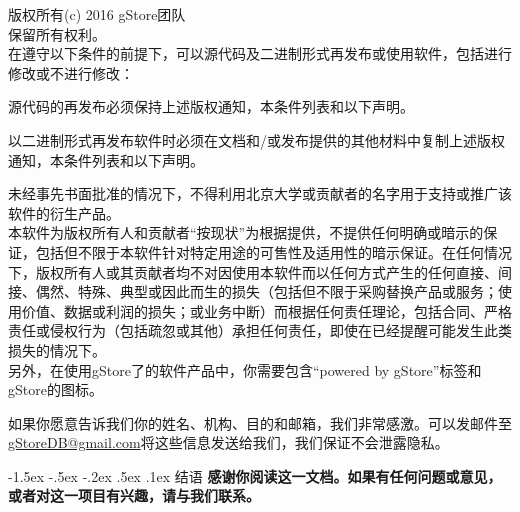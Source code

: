 \documentclass[titlepage, a4paper, 12pt]{article}
\makeatletter
\newcommand{\sihao}{\fontsize{14pt}{\baselineskip}\selectfont}
\renewcommand\section{\@startsection{section}{1}{\z@}%
{-1.5ex \@plus -.5ex \@minus -.2ex}%
{.5ex \@plus .1ex}%
{\normalfont\sihao\CJKfamily{hei}}}
\makeatother
\begin{document}
版权所有(c) 2016 gStore团队 \\
保留所有权利。\\

在遵守以下条件的前提下，可以源代码及二进制形式再发布或使用软件，包括进行修改或不进行修改：

源代码的再发布必须保持上述版权通知，本条件列表和以下声明。

以二进制形式再发布软件时必须在文档和/或发布提供的其他材料中复制上述版权通知，本条件列表和以下声明。

未经事先书面批准的情况下，不得利用北京大学或贡献者的名字用于支持或推广该软件的衍生产品。\\

本软件为版权所有人和贡献者“按现状”为根据提供，不提供任何明确或暗示的保证，包括但不限于本软件针对特定用途的可售性及适用性的暗示保证。在任何情况下，版权所有人或其贡献者均不对因使用本软件而以任何方式产生的任何直接、间接、偶然、特殊、典型或因此而生的损失（包括但不限于采购替换产品或服务；使用价值、数据或利润的损失；或业务中断）而根据任何责任理论，包括合同、严格责任或侵权行为（包括疏忽或其他）承担任何责任，即使在已经提醒可能发生此类损失的情况下。\\

另外，在使用gStore了的软件产品中，你需要包含“powered by gStore”标签和gStore的图标。

如果你愿意告诉我们你的姓名、机构、目的和邮箱，我们非常感激。可以发邮件至\href{mailto:gStoreDB@gmail.com}{gStoreDB@gmail.com}将这些信息发送给我们，我们保证不会泄露隐私。

\clearpage

\section{结语}
\textbf{感谢你阅读这一文档。如果有任何问题或意见，或者对这一项目有兴趣，请与我们联系。}

\clearpage





\clearpage


\end{document}
